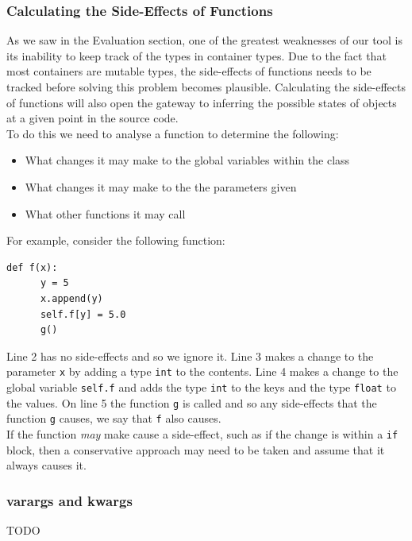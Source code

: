 \documentclass[12pt, titlepage]{article}
\begin{document}
\subsubsection*{Calculating the Side-Effects of Functions}
As we saw in the Evaluation section, one of the greatest weaknesses of our tool is its inability to keep track of the types in container types. Due to the fact that most containers are mutable types, the side-effects of functions needs to be tracked before solving this problem becomes plausible. Calculating the side-effects of functions will also open the gateway to inferring the possible states of objects at a given point in the source code. \\
\indent To do this we need to analyse a function to determine the following:
\begin{itemize}
	\item What changes it may make to the global variables within the class
	\item What changes it may make to the the parameters given
	\item What other functions it may call
\end{itemize}
For example, consider the following function:
\begin{lstlisting}[mathescape]
    def f(x):
      y = 5
      x.append(y)
      self.f[y] = 5.0
      g()
\end{lstlisting}
Line 2 has no side-effects and so we ignore it. Line 3 makes a change to the parameter \texttt{x} by adding a type \texttt{int} to the contents. Line 4 makes a change to the global variable \texttt{self.f} and adds the type \texttt{int} to the keys and the type \texttt{float} to the values. On line 5 the function \texttt{g} is called and so any side-effects that the function \texttt{g} causes, we say that \texttt{f} also causes. \\
\indent If the function \textit{may} make cause a side-effect, such as if the change is within a \texttt{if} block, then a conservative approach may need to be taken and assume that it always causes it.

\subsubsection*{varargs and kwargs}
TODO
\end{document}
